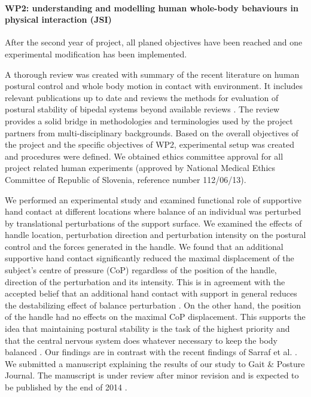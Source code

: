 

 
\paragraph*{WP2: understanding and modelling human whole-body behaviours in physical interaction (JSI)}

After the second year of project, all planed objectives have been reached and one experimental modification has been implemented.

A thorough review was created with summary of the recent literature on human postural control and whole body motion in contact with environment. It includes relevant publications up to date and reviews the methods for evaluation of postural stability of bipedal systems beyond available reviews \cite{Mergner2007, Azevedo2007}. The review provides a solid bridge in methodologies and terminologies used by the project partners from multi-disciplinary backgrounds. Based on the overall objectives of the project and the specific objectives of WP2, experimental setup was created and procedures were defined. We obtained ethics committee approval for all project related human experiments (approved by National Medical Ethics Committee of Republic of Slovenia, reference number 112/06/13).

We performed an experimental study and examined functional role of supportive hand contact at different locations where balance of an individual was perturbed by translational perturbations of the support surface. We examined the effects of handle location, perturbation direction and perturbation intensity on the postural control and the forces generated in the handle. We found that an additional supportive hand contact significantly reduced the maximal displacement of the subject's centre of pressure (CoP) regardless of the position of the handle, direction of the perturbation and its intensity. This is in agreement with the accepted belief that an additional hand contact with support in general reduces the destabilizing effect of balance perturbation \cite{Maki1997, Bateni2005, Maki2006, Wing2011}. On the other hand, the position of the handle had no effects on the maximal CoP displacement. This supports the idea that maintaining postural stability is the task of the highest priority and that the central nervous system does whatever necessary to keep the body balanced \cite{Winter1995}. Our findings are in contrast with the recent findings of Sarraf et al. \cite{Sarraf2014}. We submitted a manuscript explaining the results of our study to Gait \& Posture Journal. The manuscript is under review after minor revision and is expected to be published by the end of 2014 \cite{Babic2014}.

